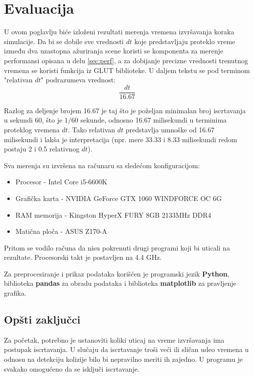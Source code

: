 \documentclass[12pt,oneside]{memoir}
\begin{document}
\chapter{Evaluacija}
\label{sec:evaluacija}

U ovom poglavlju biće izloženi rezultati merenja vremena izvršavanja koraka simulacije.
Da bi se dobile sve vrednosti $dt$ koje predstavljaju proteklo vreme između dva uzastopna ažuriranja scene
koristi se komponenta za merenje performansi opisana u delu \ref{sec:perf}, a za dobijanje precizne vrednosti trenutnog vremena se koristi funkcija iz GLUT biblioteke.
U daljem tekstu se pod terminom "relativan $dt$" podrazumeva vrednost:
$$ \frac{ dt }{16.67} $$

Razlog za deljenje brojem 16.67 je taj što je poželjan minimalan broj iscrtavanja u sekundi 60, 
što je $1/60$ sekunde, odnosno 16.67 milisekundi u terminima proteklog vremena $dt$.
Tako relativan $dt$ predstavlja umnoške od 16.67 milisekundi i lakša je interpretacija
(npr. mere 33.33 i 8.33 milisekundi redom postaju 2 i 0.5 relativnog $dt$).

Sva merenja su izvršena na računaru sa sledećom konfiguracijom:
\begin{itemize}  
	\item Procesor - Intel Core i5-6600K 
	\item Grafička karta - NVIDIA GeForce GTX 1060 WINDFORCE OC 6G
	\item RAM memorija - Kingston HyperX FURY 8GB 2133MHz DDR4 
	\item Matična ploča - ASUS Z170-A
\end{itemize}  
Pritom se vodilo računa da nisu pokrenuti drugi programi koji bi uticali na rezultate.
Procesorski takt je postavljen na 4.4 GHz.

Za preprocesiranje i prikaz podataka korišćen je programski jezik \textbf{Python},
biblioteka \textbf{pandas} za obradu podataka i biblioteka \textbf{matplotlib}
za pravljenje grafika.

\section{Opšti zaključci}

Za početak, potrebno je ustanoviti  koliki uticaj na vreme izvršavanja ima postupak iscrtavanja.
U slučaju da iscrtavanje troši veći ili sličan udeo vremena  u odnosu na detekciju kolizije bilo bi nepravilno meriti ih zajedno.
U programu je svakako omogućeno da se isključi iscrtavanje.
\end{document}
